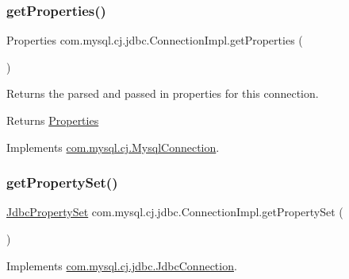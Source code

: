 \subsubsection{\texorpdfstring{get\+Properties()}{getProperties()}}
{\footnotesize\ttfamily Properties com.\+mysql.\+cj.\+jdbc.\+Connection\+Impl.\+get\+Properties (\begin{DoxyParamCaption}{ }\end{DoxyParamCaption})}

Returns the parsed and passed in properties for this connection.

\begin{DoxyReturn}{Returns}
\mbox{\hyperlink{}{Properties}} 
\end{DoxyReturn}


Implements \mbox{\hyperlink{interfacecom_1_1mysql_1_1cj_1_1_mysql_connection_a1fde8714cc1e2176748fd4f35f0df0d1}{com.\+mysql.\+cj.\+Mysql\+Connection}}.

\mbox{\label{classcom_1_1mysql_1_1cj_1_1jdbc_1_1_connection_impl_a46dbc5cd68d7e3bd2ba1931c4bd5f003}} 
\subsubsection{\texorpdfstring{get\+Property\+Set()}{getPropertySet()}}
{\footnotesize\ttfamily \mbox{\hyperlink{interfacecom_1_1mysql_1_1cj_1_1jdbc_1_1_jdbc_property_set}{Jdbc\+Property\+Set}} com.\+mysql.\+cj.\+jdbc.\+Connection\+Impl.\+get\+Property\+Set (\begin{DoxyParamCaption}{ }\end{DoxyParamCaption})}



Implements \mbox{\hyperlink{interfacecom_1_1mysql_1_1cj_1_1jdbc_1_1_jdbc_connection_a8d7309165f9280946c8ac7a4fb8a22c7}{com.\+mysql.\+cj.\+jdbc.\+Jdbc\+Connection}}.

\mbox{\label{classcom_1_1mysql_1_1cj_1_1jdbc_1_1_connection_impl_ac2c88b4ff05ae8dbed8e5ce3e79ad423}} 
